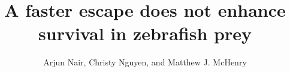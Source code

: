 \documentclass[]{rsos}%
\begin{document}
\title{A faster escape does not enhance survival in zebrafish prey}


\author{%
Arjun Nair, Christy Nguyen, and Matthew J. McHenry}

\address{Department of Ecology and Evolutionary Biology\\
University of California, Irvine\\
321 Steinhaus Hall\\
Irvine, CA 92697}

\subject{Animal behavior, biomechanics}






\maketitle




\linespread{1.6}\selectfont %
\end{document}
